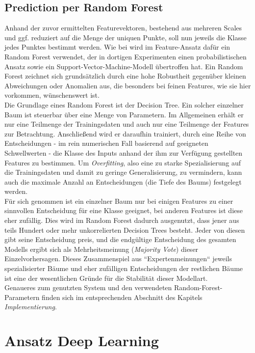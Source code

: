\subsection{Prediction per Random Forest}

Anhand der zuvor ermittelten Featurevektoren, bestehend aus mehreren Scales und ggf. reduziert auf die Menge der uniquen Punkte, soll nun jeweils die Klasse jedes Punktes bestimmt werden. Wie bei \cite{Zhiqiang.etal-2019} wird im Feature-Ansatz dafür ein Random Forest verwendet, der in dortigen Experimenten einen probabilistischen Ansatz sowie ein Support-Vector-Machine-Modell übertroffen hat. Ein Random Forest zeichnet sich grundsätzlich durch eine hohe Robustheit gegenüber kleinen Abweichungen oder Anomalien aus, die besonders bei feinen Features, wie sie hier vorkommen, wünschenswert ist. \\
Die Grundlage eines Random Forest ist der Decision Tree. Ein solcher einzelner Baum ist steuerbar über eine Menge von Parametern. Im Allgemeinen erhält er nur eine Teilmenge der Trainingsdaten und auch nur eine Teilmenge der Features zur Betrachtung. Anschließend wird er daraufhin trainiert, durch eine Reihe von Entscheidungen - im rein numerischen Fall basierend auf geeigneten Schwellwerten - die Klasse des Inputs anhand der ihm zur Verfügung gestellten Features zu bestimmen. Um \textit{Overfitting}, also eine zu starke Spezialisierung auf die Trainingsdaten und damit zu geringe Generalisierung, zu vermindern, kann auch die maximale Anzahl an Entscheidungen (die Tiefe des Baums) festgelegt werden. \\
Für sich genommen ist ein einzelner Baum nur bei einigen Features zu einer sinnvollen Entscheidung für eine Klasse geeignet, bei anderen Features ist diese eher zufällig. Dies wird im Random Forest dadurch ausgenutzt, dass jener aus teils Hundert oder mehr unkorrelierten Decision Trees besteht. Jeder von diesen gibt seine Entscheidung preis, und die endgültige Entscheidung des gesamten Modells ergibt sich als Mehrheitsmeinung (\textit{Majority Vote}) dieser Einzelvorhersagen. Dieses Zusammenspiel aus ``Expertenmeinungen`` jeweils spezialisierter Bäume und eher zufälligen Entscheidungen der restlichen Bäume ist eine der wesentlichen Gründe für die Stabilität dieser Modellart. \\
Genaueres zum genutzten System und den verwendeten Random-Forest-Parametern finden sich im entsprechenden Abschnitt des Kapitels \textit{Implementierung}.

\section{Ansatz Deep Learning}

